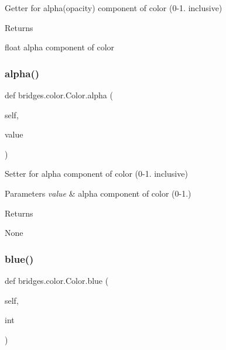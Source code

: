 Getter for alpha(opacity) component of color (0-\/1. inclusive) 

\begin{DoxyReturn}{Returns}


float alpha component of color 
\end{DoxyReturn}
\mbox{\label{classbridges_1_1color_1_1_color_ab57c1e881ebb14bccefb870a9fa2ac1d}} 
\subsubsection{\texorpdfstring{alpha()}{alpha()}\hspace{0.1cm}{\footnotesize\ttfamily [2/2]}}
{\footnotesize\ttfamily def bridges.\+color.\+Color.\+alpha (\begin{DoxyParamCaption}\item[{}]{self,  }\item[{}]{value }\end{DoxyParamCaption})}



Setter for alpha component of color (0-\/1. inclusive) 


\begin{DoxyParams}{Parameters}
{\em value} & alpha component of color (0-\/1.) \\
\hline
\end{DoxyParams}
\begin{DoxyReturn}{Returns}


None 
\end{DoxyReturn}
\mbox{\label{classbridges_1_1color_1_1_color_a14f94eb29dcabf578a1932c5477e12f3}} 
\subsubsection{\texorpdfstring{blue()}{blue()}\hspace{0.1cm}{\footnotesize\ttfamily [1/2]}}
{\footnotesize\ttfamily def bridges.\+color.\+Color.\+blue (\begin{DoxyParamCaption}\item[{}]{self,  }\item[{}]{int }\end{DoxyParamCaption})}



